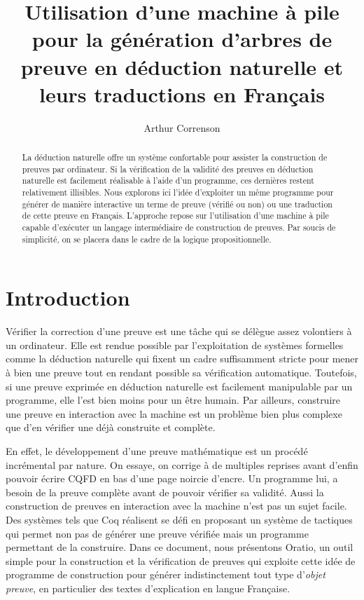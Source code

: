 \documentclass{article}
\begin{document}
\author{Arthur Correnson}
\title{Utilisation d'une machine à pile pour la génération d'arbres de preuve en déduction naturelle et leurs traductions en Français}
\maketitle

\begin{abstract}
  La déduction naturelle offre un système confortable pour assister la construction de preuves par ordinateur. Si la vérification de la validité des preuves en déduction naturelle est facilement réalisable à l'aide d'un programme, ces dernières restent relativement illisibles. Nous explorons ici l'idée d'exploiter un même programme pour générer de manière interactive un terme de preuve (vérifié ou non) ou une traduction de cette preuve en Français. L'approche repose sur l'utilisation d'une machine à pile capable d'exécuter un langage intermédiaire de construction de preuves. Par soucis de simplicité, on se placera dans le cadre de la logique propositionnelle.
\end{abstract}

\section{Introduction}

Vérifier la correction d'une preuve est une tâche qui se délègue assez volontiers à un ordinateur. Elle est rendue possible par l'exploitation de systèmes formelles comme la déduction naturelle qui fixent un cadre suffisamment stricte pour mener à bien une preuve tout en rendant possible sa vérification automatique. Toutefois, si une preuve exprimée en déduction naturelle est facilement manipulable par un programme, elle l'est bien moins pour un être humain. Par ailleurs, construire une preuve en interaction avec la machine est un problème bien plus complexe que d'en vérifier une déjà construite et complète.

En effet, le développement d'une preuve mathématique est un procédé incrémental par nature. On essaye, on corrige à de multiples reprises avant d'enfin pouvoir écrire CQFD en bas d'une page noircie d'encre. Un programme lui, a besoin de la preuve complète avant de pouvoir vérifier sa validité. Aussi la construction de preuves en interaction avec la machine n'est pas un sujet facile. Des systèmes tels que Coq réalisent se défi en proposant un système de tactiques qui permet non pas de générer une preuve vérifiée mais un programme permettant de la construire. Dans ce document, nous présentons Oratio, un outil simple pour la construction et la vérification de preuves qui exploite cette idée de programme de construction pour générer indistinctement tout type d'\textit{objet preuve}, en particulier des textes d'explication en langue Française.
\end{document}
